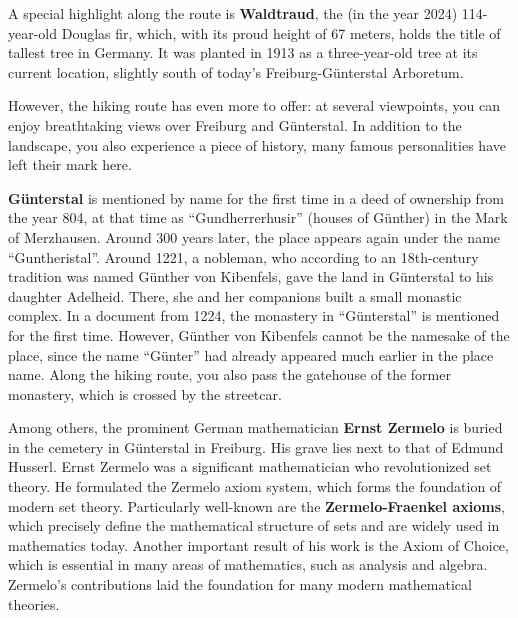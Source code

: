 \documentclass[landscape, a4paper]{article}
\newcommand\alert[1]{\textcolor{PrimaryColor}{\textbf{#1}}}
\begin{document}
\begin{minipage}[t]{0.31\textwidth}
  A special highlight along the route is \alert{Waldtraud}, the (in the year 2024) 114-year-old Douglas fir, which, with its proud height of 67 meters, holds the title of tallest tree in Germany. It was planted in 1913 as a three-year-old tree at its current location, slightly south of today's Freiburg-Günterstal Arboretum.

However, the hiking route has even more to offer: at several viewpoints, you can enjoy breathtaking views over Freiburg and Günterstal. In addition to the landscape, you also experience a piece of history, many famous personalities have left their mark here.

\end{minipage}%
\hfill\color{white}%
\vrule width 0.01cm
\hfill\color{black}%
\begin{minipage}[t]{0.31\textwidth}
	\setlength{\parskip}{0.25cm}

  \alert{Günterstal} is mentioned by name for the first time in a deed of ownership from the year 804, at that time as \enquote{Gundherrerhusir} (houses of Günther) in the Mark of Merzhausen. Around 300 years later, the place appears again under the name \enquote{Guntheristal}. Around 1221, a nobleman, who according to an 18th-century tradition was named Günther von Kibenfels, gave the land in Günterstal to his daughter Adelheid. There, she and her companions built a small monastic complex. In a document from 1224, the monastery in \enquote{Günterstal} is mentioned for the first time. However, Günther von Kibenfels cannot be the namesake of the place, since the name \enquote{Günter} had already appeared much earlier in the place name. Along the hiking route, you also pass the gatehouse of the former monastery, which is crossed by the streetcar.

  Among others, the prominent German mathematician \alert{Ernst Zermelo} is buried in the cemetery in Günterstal in Freiburg. His grave lies next to that of Edmund Husserl. Ernst Zermelo was a significant mathematician who revolutionized set theory. He formulated the Zermelo axiom system, which forms the foundation of modern set theory. Particularly well-known are the \alert{Zermelo-Fraenkel axioms}, which precisely define the mathematical structure of sets and are widely used in mathematics today. Another important result of his work is the Axiom of Choice, which is essential in many areas of mathematics, such as analysis and algebra. Zermelo's contributions laid the foundation for many modern mathematical theories.


\end{minipage}
\end{document}
